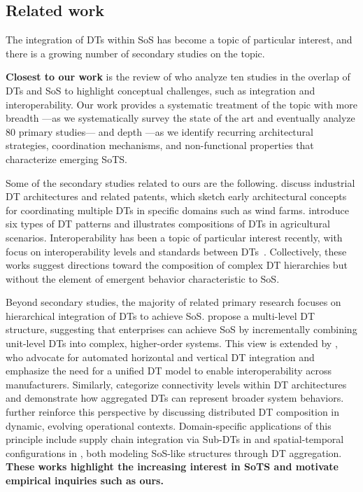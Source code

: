 \subsection{Related work}\label{sec:relatedwork}
The integration of DTs within SoS has become a topic of particular interest, and there is a growing number of secondary studies on the topic.

\textbf{Closest to our work} is the review of \textcite{olsson2023systems} who analyze ten studies in the overlap of DTs and SoS to highlight conceptual challenges, such as integration and interoperability.
Our work provides a systematic treatment of the topic with more breadth ---as we systematically survey the state of the art and eventually analyze 80 primary studies--- and depth ---as we identify recurring architectural strategies, coordination mechanisms, and non-functional properties that characterize emerging SoTS.

Some of the secondary studies related to ours are the following. \textcite{tao2018digital} discuss industrial DT architectures and related patents, which sketch early architectural concepts for coordinating multiple DTs in specific domains such as wind farms. \textcite{verdouw2021digital} introduce six types of DT patterns and illustrates compositions of DTs in agricultural scenarios. Interoperability has been a topic of particular interest recently, with focus on interoperability levels and standards between DTs~\cite{wang2023survey,david2024interoperability}.
Collectively, these works suggest directions toward the composition of complex DT hierarchies but without the element of emergent behavior characteristic to SoS.

Beyond secondary studies, the majority of related primary research focuses on hierarchical integration of DTs to achieve SoS. \textcite{tao2019digital} propose a multi-level DT structure, suggesting that enterprises can achieve SoS by incrementally combining unit-level DTs into complex, higher-order systems. This view is extended by \textcite{gill2024toward}, who advocate for automated horizontal and vertical DT integration and emphasize the need for a unified DT model to enable interoperability across manufacturers. Similarly, \textcite{schroeder2021digital} categorize connectivity levels within DT architectures and demonstrate how aggregated DTs can represent broader system behaviors. \textcite{ghanbarifard2023digital} further reinforce this perspective by discussing distributed DT composition in dynamic, evolving operational contexts. Domain-specific applications of this principle include supply chain integration via Sub-DTs in \textcite{zhang2021supply} and spatial-temporal configurations in \textcite{dietz2020digital}, both modeling SoS-like structures through DT aggregation. 
\textbf{These works highlight the increasing interest in SoTS and motivate empirical inquiries such as ours.}

